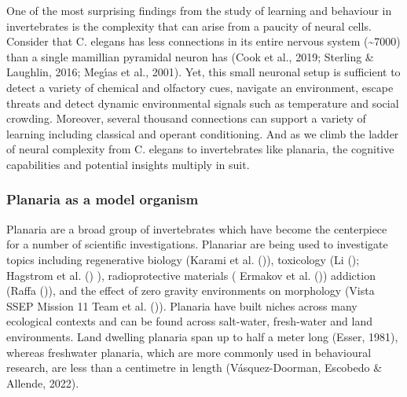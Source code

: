 \documentclass[
  letterpaper,
  DIV=11,
  numbers=noendperiod,
  oneside]{scrartcl}
\begin{document}
One of the most surprising findings from the study of learning and
behaviour in invertebrates is the complexity that can arise from a
paucity of neural cells. Consider that C. elegans has less connections
in its entire nervous system (\textasciitilde7000) than a single
mamillian pyramidal neuron has (Cook et al., 2019; Sterling \& Laughlin,
2016; Megı́as et al., 2001). Yet, this small neuronal setup is sufficient
to detect a variety of chemical and olfactory cues, navigate an
environment, escape threats and detect dynamic environmental signals
such as temperature and social crowding. Moreover, several thousand
connections can support a variety of learning including classical and
operant conditioning. And as we climb the ladder of neural complexity
from C. elegans to invertebrates like planaria, the cognitive
capabilities and potential insights multiply in suit.

\subsubsection{Planaria as a model
organism}\label{planaria-as-a-model-organism}

Planaria are a broad group of invertebrates which have become the
centerpiece for a number of scientific investigations. Planariar are
being used to investigate topics including regenerative biology (Karami
et al. ()), toxicology (Li
(); Hagstrom et al.
() ), radioprotective materials (
Ermakov et al. ()) addiction
(Raffa ()), and the effect of zero gravity
environments on morphology (Vista SSEP Mission 11 Team et al.
()). Planaria have built
niches across many ecological contexts and can be found across
salt-water, fresh-water and land environments. Land dwelling planaria
span up to half a meter long (Esser, 1981), whereas freshwater planaria,
which are more commonly used in behavioural research, are less than a
centimetre in length (Vásquez-Doorman, Escobedo \& Allende, 2022).
\end{document}
